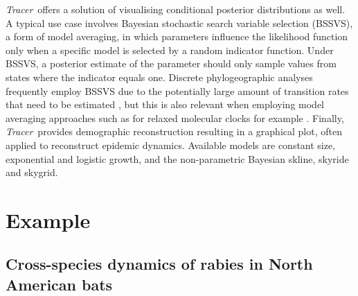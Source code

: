 \documentclass{bioinfo}
\newcommand{\tracer}{\emph{Tracer}}
\begin{document}
\tracer\ offers a solution of visualising conditional posterior distributions as well.
A typical use case involves Bayesian stochastic search variable selection (BSSVS), a form of model averaging, in which parameters influence the likelihood function only when a specific model is selected by a random indicator function.
Under BSSVS, a posterior estimate of the parameter should only sample values from states where the indicator equals one.
Discrete phylogeographic analyses frequently employ BSSVS due to the potentially large amount of transition rates that need to be estimated \citep{Lemey2009}, but this is also relevant when employing model averaging approaches such as for relaxed molecular clocks for example \citep{Li2012}.
%
Finally, \tracer\ provides demographic reconstruction resulting in a graphical plot, often applied to reconstruct epidemic dynamics.
Available models are constant size, exponential and logistic growth,
and the non-parametric Bayesian skline, skyride and skygrid.

\section*{Example}

\subsection*{Cross-species dynamics of rabies in North American bats}
\end{document}
